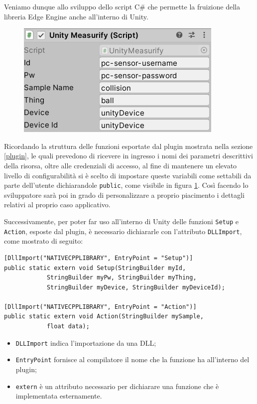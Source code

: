 Veniamo dunque allo sviluppo dello script C\# che permette la fruizione della libreria Edge Engine anche all'interno di Unity.  

\begin{figure}
	\centering
	\includegraphics[scale=0.85]{pics/unityscriptvars}
	\caption{}
	\label{unityscriptvars}
\end{figure}

Ricordando la struttura delle funzioni esportate dal plugin mostrata nella sezione \ref{plugin}, le quali prevedono di ricevere in ingresso i nomi dei parametri descrittivi della risorsa, oltre alle credenziali di accesso, al fine di mantenere un elevato livello di configurabilità si è scelto di impostare queste variabili come settabili da parte dell'utente dichiarandole \texttt{public}, come visibile in figura \ref{unityscriptvars}. Così facendo lo sviluppatore sarà poi in grado di personalizzare a proprio piacimento i dettagli relativi al proprio caso applicativo.

Successivamente, per poter far uso all'interno di Unity delle funzioni \texttt{Setup} e \texttt{Action}, esposte dal plugin, è necessario dichiararle con l’attributo \texttt{DLLImport}, come mostrato di seguito:

\begin{verbatim}
[DllImport("NATIVECPPLIBRARY", EntryPoint = "Setup")]
public static extern void Setup(StringBuilder myId, 
            StringBuilder myPw, StringBuilder myThing, 
            StringBuilder myDevice, StringBuilder myDeviceId);

[DllImport("NATIVECPPLIBRARY", EntryPoint = "Action")]
public static extern void Action(StringBuilder mySample, 
            float data);
\end{verbatim}

\begin{itemize}
	\item \texttt{DLLImport} indica l'importazione da una DLL;
	\item \texttt{EntryPoint} fornisce al compilatore il nome che la funzione ha all'interno del plugin;
	\item \texttt{extern} è un attributo necessario per dichiarare una funzione che è implementata esternamente.
\end{itemize}


